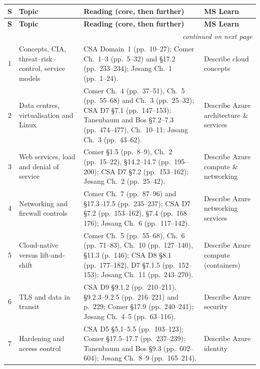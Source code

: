 \bigskip
{\small
\nolinenumbers
\renewcommand{\arraystretch}{1.35}
\begin{longtable}{@{}c p{2.4cm} p{7.9cm} p{2.5cm}@{}}
\toprule
\textbf{S} & \textbf{Topic} & \textbf{Reading (core, then further)} & \textbf{MS Learn} \\
\midrule
\endfirsthead
\toprule
\textbf{S} & \textbf{Topic} & \textbf{Reading (core, then further)} & \textbf{MS Learn} \\
\midrule
\endhead
\bottomrule
\multicolumn{4}{r}{\footnotesize\itshape continued on next page}\\
\endfoot
\bottomrule
\endlastfoot

1 & Concepts, CIA, threat--risk--control, service models &
CSA Domain~1 (pp.~10--27); Comer Ch.~1--3 (pp.~5--32) and \S17.2
(pp.~233--234); J\o sang Ch.~1 (pp.~1--24). &
Describe cloud concepts \\

2 & Data centres, virtualisation and Linux &
Comer Ch.~4 (pp.~37--51), Ch.~5 (pp.~55--68) and Ch.~3 (pp.~25--32); CSA D7
\S7.1 (pp.~147--153); Tanenbaum and Bos \S7.2--7.3 (pp.~474--477), Ch.~10--11;
J\o sang Ch.~3 (pp.~43--62). &
Describe Azure architecture \& services \\

3 & Web services, load and denial of service &
Comer \S1.5 (pp.~8--9), Ch.~2 (pp.~15--22), \S14.2--14.7 (pp.~195--200); CSA D7
\S7.2 (pp.~153--162); J\o sang Ch.~2 (pp.~25--42). &
Describe Azure compute \& networking \\

4 & Networking and firewall controls &
Comer Ch.~7 (pp.~87--96) and \S17.3--17.5 (pp.~235--237); CSA D7 \S7.2
(pp.~153--162), \S7.4 (pp.~168--176); J\o sang Ch.~6 (pp.~117--142). &
Describe Azure networking services \\

5 & Cloud-native versus lift-and-shift &
Comer Ch.~5 (pp.~55--68), Ch.~6 (pp.~71--83), Ch.~10 (pp.~127--140), \S11.3
(p.~146); CSA D8 \S8.1 (pp.~177--182), D7 \S7.1.5 (pp.~152--153); J\o sang
Ch.~11 (pp.~243--270). &
Describe Azure compute (containers) \\

6 & TLS and data in transit &
CSA D9 \S9.1.2 (pp.~210--211), \S9.2.3--9.2.5 (pp.~216--221) and p.~229; Comer
\S17.9 (pp.~240--241); J\o sang Ch.~4--5 (pp.~63--116). &
Describe Azure security \\

7 & Hardening and access control &
CSA D5 \S5.1--5.5 (pp.~103--123); Comer \S17.5--17.7 (pp.~237--239);
Tanenbaum and Bos \S9.3 (pp.~602--604); J\o sang Ch.~8--9 (pp.~165--214). &
Describe Azure identity \\


\end{longtable}}
